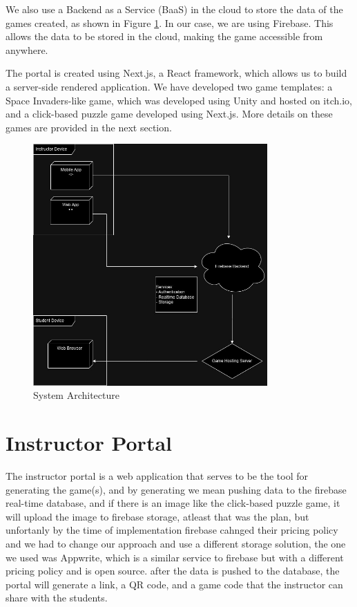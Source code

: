 We also use a Backend as a Service (BaaS) in the cloud to store the data of the games created, as shown in Figure \ref{fig:architecture}. In our case, we are using Firebase. This allows the data to be stored in the cloud, making the game accessible from anywhere.

The portal is created using Next.js, a React framework, which allows us to build a server-side rendered application. We have developed two game templates: a Space Invaders-like game, which was developed using Unity and hosted on itch.io, and a click-based puzzle game developed using Next.js. More details on these games are provided in the next section.

\begin{figure}
\centering
\includegraphics[width=0.8\textwidth]{figures/Deployment_UML.jpg}
\caption{System Architecture}
\label{fig:architecture}
\end{figure}

\section{Instructor Portal}
The instructor portal is a web application that serves to be the tool for generating the game(s), and by generating we mean pushing data to the firebase real-time database, 
and if there is an image like the click-based puzzle game, 
it will upload the image to firebase storage, atleast that was the plan, 
but unfortanly by the time of implementation firebase cahnged their pricing policy and we had to change our approach and use a different storage solution, 
the one we used was Appwrite, which is a similar service to firebase but with a different pricing policy and is open source.
after the data is pushed to the database, the portal will generate a link, a QR code, and a game code that the instructor can share with the students.


